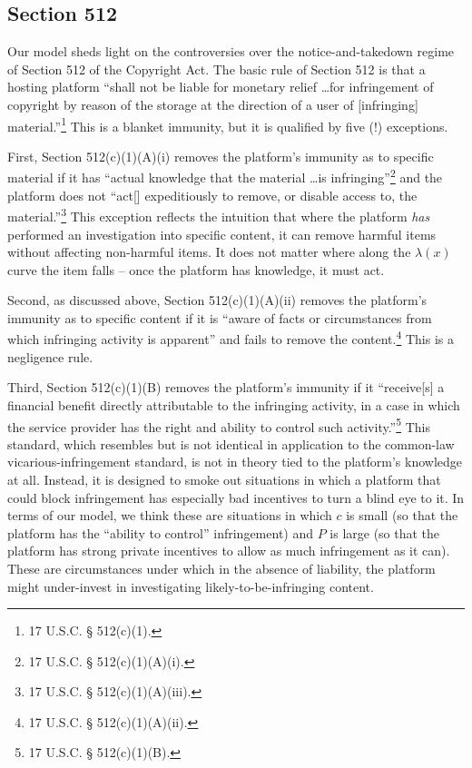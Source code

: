 % 
\subsection{Section 512}

Our model sheds light on the controversies over the notice-and-takedown regime of Section 512 of the Copyright Act. The basic rule of Section 512 is that a hosting platform ``shall not be liable for monetary relief \ldots for infringement of copyright by reason of the storage at the direction of a user of [infringing] material.''\footnote{17 U.S.C. § 512(c)(1).} This is a blanket immunity, but it is qualified by five (!) exceptions.

First, Section 512(c)(1)(A)(i) removes the platform's immunity as to specific material if it has ``actual knowledge that the material \ldots is infringing''\footnote{17 U.S.C. § 512(c)(1)(A)(i).} and the platform does not ``act[] expeditiously to remove, or disable access to, the material.''\footnote{17 U.S.C. § 512(c)(1)(A)(iii).} This exception reflects the intuition that where the platform \emph{has} performed an investigation into specific content, it can remove harmful items without affecting non-harmful items. It does not matter where along the $\lambda(x)$ curve the item falls -- once the platform has knowledge, it must act. 

Second, as discussed above, Section 512(c)(1)(A)(ii) removes the platform's immunity as to specific content if it is ``aware of facts or circumstances from which infringing activity is apparent'' and fails to remove the content.\footnote{17 U.S.C. § 512(c)(1)(A)(ii).} This is a negligence rule.

Third, Section 512(c)(1)(B) removes the platform's immunity if it ``receive[s] a financial benefit directly attributable to the infringing activity, in a case in which the service provider has the right and ability to control such activity.''\footnote{17 U.S.C. § 512(c)(1)(B).} This standard, which resembles but is not identical in application to the common-law vicarious-infringement standard, is not in theory tied to the platform's knowledge at all. Instead, it is designed to smoke out situations in which a platform that could block infringement has especially bad incentives to turn a blind eye to it. In terms of our model, we think these are situations in which $c$ is small (so that the platform has the ``ability to control'' infringement) and $P$ is large (so that the platform has strong private incentives to allow as much infringement as it can). These are circumstances under which in the absence of liability, the platform might under-invest in investigating likely-to-be-infringing content.

